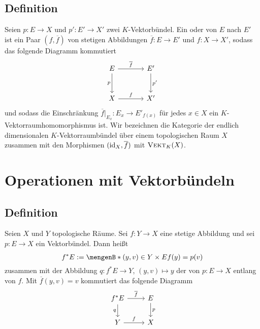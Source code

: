 \subsection[Definition: Vektorraumbündelmorphismus]{Definition} %
\label{sub:22}
Seien $p \colon E \to X$ und $p' \colon E' \to X'$ zwei $K$-Vektorbündel. Ein  oder 
 von $E$ nach $E'$ ist ein Paar $(f, \overline{f})$ von stetigen Abbildungen $\overline{f} \colon E \to E'$ und $f \colon X \to X'$, sodass 
das folgende Diagramm kommutiert
\[
	\begin{tikzcd}[sep=large]
		E \rar["\overline{f}"] \dar["p"'] & E' \dar["p'"] \\
		X \rar["f"] & X'
	\end{tikzcd}
\]
und sodass die Einschränkung $\overline{f}\big|_{E_x} \colon E_x \to E'_{f(x)}$ für jedes $x \in X$ ein $K$-Vektorraumhomomorphismus ist. Wir bezeichnen die Kategorie der 
endlich dimensionalen $K$-Vektorraumbündel über einem topologischen Raum $X$ zusammen mit den Morphismen $(\operatorname{id}_X, \overline{f})$ mit $\textsc{Vekt}_K(X)$.

\section*{Operationen mit Vektorbündeln}
\subsection[Definition: Pullback]{Definition} %
\label{sub:23}
Seien $X$ und $Y$ topologische Räume. Sei $f \colon Y \to X$ eine stetige Abbildung und sei $p \colon E \to X$ ein Vektorbündel. Dann heißt
\[
	f^* E := \set[(y,v) \in Y \times E]{f(y)=p(v)\rule{0cm}{0.9em}} 
\]
zusammen mit der Abbildung $q \colon f^* E \to Y$, $(y,v) \mapsto y$ der  von $p \colon E \to X$ entlang von $f$. Mit $\overline{f}(y,v)=v$ kommutiert das 
folgende Diagramm
\[
	\begin{tikzcd}
		f^* E \rar["\overline{f}"] \dar["q"'] & E \dar["p"] \\
		Y \rar["f"] & X
	\end{tikzcd}
\]

